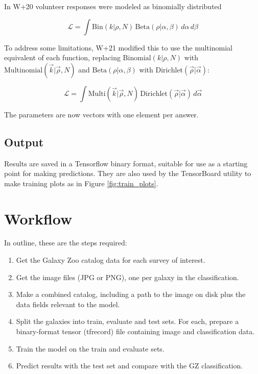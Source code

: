 \documentclass[preprint]{aastex631}
\begin{document}
In W+20 volunteer responses were modeled as binomially distributed

\begin{equation}
 \mathcal{L} = \int \mathrm{Bin} (k | \rho, N)\, \mathrm{Beta} (\rho | \alpha, \beta)\, d\alpha\, d\beta 
\end{equation}

To address some limitations, W+21 modified this to use the multinomial equivalent of each function, replacing $\mathrm{Binomial} (k | \rho, N)$ with $\mathrm{Multinomial} (\vec{k} | \vec{\rho}, N)$ and $\mathrm{Beta} (\rho | \alpha, \beta)$ with $\mathrm{Dirichlet} (\vec{\rho} | \vec{\alpha})$:

\begin{equation}
 \mathcal{L} = \int \mathrm{Multi} (\vec{k} | \vec{\rho}, N)\, \mathrm{Dirichlet} (\vec{\rho} | \vec{\alpha})\, d\vec{\alpha} 
\end{equation}

The parameters are now vectors with one element per answer.

\subsection{Output}

Results are saved in a Tensorflow binary format, suitable for use as a starting point for making predictions. They are also used by the TensorBoard utility to make training plots as in Figure \ref{fig:train_plots}.


\section{Workflow}

In outline, these are the steps required:

\begin{enumerate}
	\item Get the Galaxy Zoo catalog data for each survey of interest.
	\item Get the image files (JPG or PNG), one per galaxy in the classification.
	\item Make a combined catalog, including a path to the image on disk plus the data fields relevant to the model.
	\item Split the galaxies into train, evaluate and test sets. For each, prepare a binary-format tensor (tfrecord) file containing image and classification data.
	\item Train the model on the train and evaluate sets.
	\item Predict results with the test set and compare with the GZ classification.
\end{enumerate}
\end{document}
